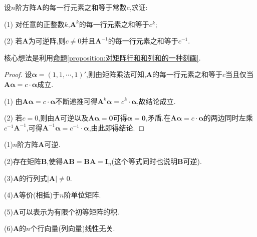 \documentclass[../../main.tex]{subfiles}%
\begin{document}
\begin{example}
设\(n\)阶方阵\(\boldsymbol{A}\)的每一行元素之和等于常数\(c\),求证:

(1) 对任意的正整数\(k\),\(\boldsymbol{A}^{k}\)的每一行元素之和等于\(c^{k}\);

(2) 若\(\boldsymbol{A}\)为可逆阵,则\(c \neq 0\)并且\(\boldsymbol{A}^{-1}\)的每一行元素之和等于\(c^{-1}\).
\end{example}
\begin{note}
核心想法是利用\hyperref[proposition:对矩阵行和和列和的一种刻画]{命题\ref{proposition:对矩阵行和和列和的一种刻画}}.
\end{note}
\begin{proof}
设\(\boldsymbol{\alpha} = (1,1,\cdots,1)'\),则由矩阵乘法可知,\(\boldsymbol{A}\)的每一行元素之和等于\(c\)当且仅当\(\boldsymbol{A}\boldsymbol{\alpha} = c \cdot \boldsymbol{\alpha}\)成立.

(1) 由\(\boldsymbol{A}\boldsymbol{\alpha} = c \cdot \boldsymbol{\alpha}\)不断递推可得\(\boldsymbol{A}^{k}\boldsymbol{\alpha} = c^{k} \cdot \boldsymbol{\alpha}\),故结论成立.

(2) 若\(c = 0\),则由\(\boldsymbol{A}\)可逆以及\(\boldsymbol{A}\boldsymbol{\alpha} = \boldsymbol{0}\)可得\(\boldsymbol{\alpha} = \boldsymbol{0}\),矛盾.在\(\boldsymbol{A}\boldsymbol{\alpha} = c \cdot \boldsymbol{\alpha}\)的两边同时左乘\(c^{-1}\boldsymbol{A}^{-1}\),可得\(\boldsymbol{A}^{-1}\boldsymbol{\alpha} = c^{-1} \cdot \boldsymbol{\alpha}\),由此即得结论.
\end{proof}

\begin{proposition}[矩阵可逆的等价命题]\label{proposition:矩阵可逆的等价命题}
(1)\(n\)阶方阵\(\boldsymbol{A}\)可逆.

(2)存在矩阵$\boldsymbol{B}$,使得$\boldsymbol{AB}=\boldsymbol{BA}=\boldsymbol{I}_n$(这个等式同时也说明$\boldsymbol{B}$可逆).

(3)\(\boldsymbol{A}\)的行列式\(\vert \boldsymbol{A}\vert\neq0\).

(4)\(\boldsymbol{A}\)等价(相抵)于\(n\)阶单位矩阵.

(5)\(\boldsymbol{A}\)可以表示为有限个初等矩阵的积.

(6)\(\boldsymbol{A}\)的\(n\)个行向量(列向量)线性无关.
\end{proposition}
\end{document}

